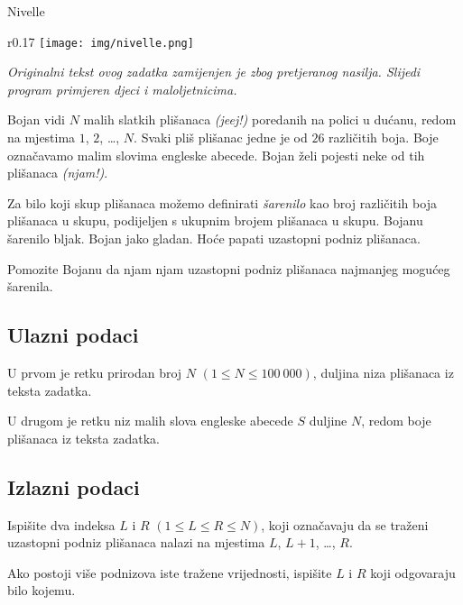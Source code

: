 \begin{statement}[
  problempoints=110,
  timelimit=1 sekunda,
  memorylimit=512 MiB,
]{Nivelle}

\setlength\intextsep{-0.1cm}
\begin{wrapfigure}[9]{r}{0.17\textwidth}
\centering
\texttt{[image: img/nivelle.png]}
\end{wrapfigure}

\textit{Originalni tekst ovog zadatka zamijenjen je zbog pretjeranog nasilja.
Slijedi program primjeren djeci i maloljetnicima.}

Bojan vidi $N$ malih slatkih plišanaca \textit{(jeej!)} poredanih na polici u
dućanu, redom na mjestima $1$, $2$, \dots, $N$. Svaki pliš plišanac jedne je od
$26$ različitih boja. Boje označavamo malim slovima engleske abecede. Bojan
želi pojesti neke od tih plišanaca \textit{(njam!)}.

Za bilo koji skup plišanaca možemo definirati \textit{šarenilo} kao broj
različitih boja plišanaca u skupu, podijeljen s ukupnim brojem plišanaca u
skupu. Bojanu šarenilo bljak. Bojan jako gladan. Hoće papati uzastopni podniz
plišanaca.

Pomozite Bojanu da njam njam uzastopni podniz plišanaca najmanjeg mogućeg
šarenila.

\subsection*{Ulazni podaci}
U prvom je retku prirodan broj $N$ $(1 \le N \le 100\ 000)$, duljina niza
plišanaca iz teksta zadatka.

U drugom je retku niz malih slova engleske abecede $S$ duljine $N$, redom boje
plišanaca iz teksta zadatka.

\subsection*{Izlazni podaci}
Ispišite dva indeksa $L$ i $R$ $(1 \le L \le R \le N)$, koji označavaju da se
traženi uzastopni podniz plišanaca nalazi na mjestima $L$, $L+1$, \dots, $R$.

Ako postoji više podnizova iste tražene vrijednosti, ispišite $L$ i $R$ koji
odgovaraju bilo kojemu.


\end{statement}
